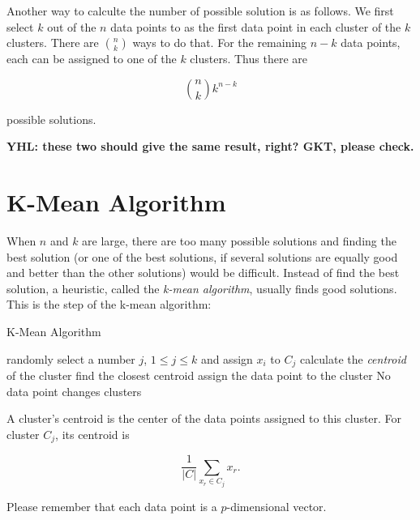 Another way to calculte the number of possible solution is as follows.
We first select $k$ out of the $n$ data points to as the first data
point in each cluster of the $k$ clusters. There are $\binom{n}{k}$
ways to do that.  For the remaining $n-k$ data points, each can be
assigned to one of the $k$ clusters. Thus there are

\begin{equation}
  \binom{n}{k} k^{n-k}
\end{equation}

possible solutions.

{\bf YHL: these two should give the same result, right? GKT, please check.}




\section{K-Mean Algorithm}

When $n$ and $k$ are large, there are too many possible solutions and
finding the best solution (or one of the best solutions, if several
solutions are equally good and better than the other solutions) would
be difficult. Instead of find the best solution, a heuristic, called
the {\it k-mean algorithm}, usually finds good solutions.  This is the
step of the k-mean algorithm:


\begin{algorithm}
    \caption[]{K-Mean Algorithm}
    \begin{algorithmic}[1]
      randomly select a number $j$, $1 \le j \le k$ and assign
      $x_i$ to $C_j$
      \EndFor
      \Repeat 
      \State
      calculate the {\it centroid} of the cluster
      \EndFor
      \State find the closest centroid
      \State assign the data point to  the cluster
      \EndFor
      \Until No data point changes clusters
    \end{algorithmic}
\end{algorithm}

A cluster's centroid is  the center of the data points assigned to this cluster.
For cluster $C_j$, its centroid is 

\begin{equation}
\frac{1}{|C|} \underset{x_r \in C_j}{\sum} x_r.
\end{equation}  

Please remember that each data point is a $p$-dimensional vector.

